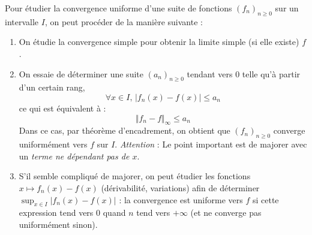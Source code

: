 \documentclass[french,11pt,twoside]{VcCours}
\begin{document}
\begin{Methode}{} Pour étudier la convergence uniforme d'une suite de fonctions $(f_n)_{n \geq 0}$  sur un intervalle $I$, on peut procéder de la manière suivante :

\begin{enumerate}
\item On étudie la convergence simple pour obtenir la limite simple (si elle existe) $f$.
\item On essaie de déterminer une suite $(a_n)_{n \geq 0}$ tendant vers $0$ telle qu'à partir d'un certain rang,
$$ \forall x \in I, \, \vert f_n(x)-f(x) \vert \leq a_n$$
ce qui est équivalent à :
$$ \Vert f_n - f \Vert_{\infty} \leq a_n$$
Dans ce cas, par théorème d'encadrement, on obtient que $(f_n)_{n \geq 0}$ converge uniformément vers $f$ sur $I$. \emph{Attention} : Le point important est de majorer avec un \emph{terme ne dépendant pas de $x$}.
\item S'il semble compliqué de majorer, on peut étudier les fonctions $x \mapsto f_n(x)-f(x)$ (dérivabilité, variations) afin de déterminer $\sup_{x \in I} \vert f_n(x)-f(x) \vert$ : la convergence est uniforme vers $f$ si cette expression tend vers $0$ quand $n$ tend vers $+ \infty$ (et ne converge pas uniformément sinon). 
\end{enumerate}
\end{Methode}
\end{document}
